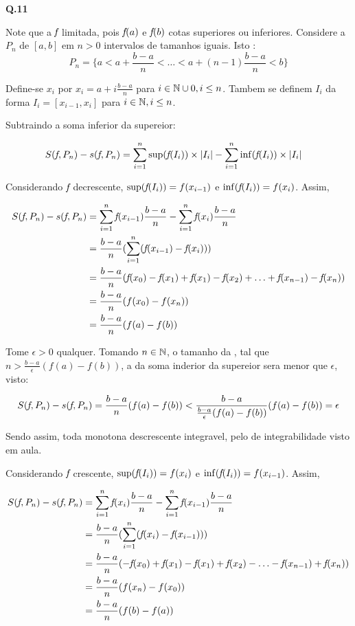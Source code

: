 \textbf{Q.11}

Note que a \funcao $\mkern-2mu f\mkern-3mu$ \eh limitada, pois $\mkern-2mu f\mkern-3mu(a)$ e $\mkern-2mu f\mkern-3mu(b)$ \sao cotas superiores ou inferiores. Considere a \particao $P_n$ de $[a,b]$ em $n > 0$ intervalos de tamanhos iguais. Isto \eh:
$$
P_n = \{a < a + \frac{b-a}{n} < \ldots < a + (n-1)\frac{b-a}{n} < b\}
$$

Define-se $x_i$ por $x_i = a + i\frac{b-a}{n}$ para $i \in \mathbb{N}\cup {0}, i \leq n$. Tambem se definem $I_i$ da forma $I_i = [x_{i-1}, x_i]$ para $i \in \mathbb{N}, i \leq n$.


Subtraindo a soma inferior da supereior:

\begin{align*}
	S(\mkern-2mu f\mkern-3mu,P_n) - s(\mkern-2mu f\mkern-3mu,P_n) &= \sum_{i=1}^{n} \sup(\mkern-2mu f\mkern-3mu(I_i))\times|I_i| - \sum_{i=1}^{n} \inf(\mkern-2mu f\mkern-3mu(I_i))\times|I_i|
\end{align*}

Considerando $\mkern-2mu f\mkern-3mu$ decrescente, $\sup(\mkern-2mu f\mkern-3mu(I_i)) = f(x_{i-1})$ e $\inf(\mkern-2mu f\mkern-3mu(I_i)) = f(x_i)$. Assim, 

\begin{align*}
	S(\f,P_n) - s(\f,P_n) &= \sum_{i=1}^{n} \f (x_{i-1})\frac{b-a}{n} - \sum_{i=1}^{n} \f (x_i)\frac{b-a}{n} \\
	&= \frac{b-a}{n}(\sum_{i=1}^{n}(\f (x_{i-1}) - \f (x_i))) \\
	&= \frac{b-a}{n}(\f (x_0) - \f (x_1) + \f (x_1) - \f (x_2) + \ldots + \f(x_{n-1}) - \f(x_n)) \\
	&= \frac{b-a}{n}(f(x_0) - f(x_n)) \\
	&= \frac{b-a}{n}(f(a)-f(b)) \\
\end{align*}

Tome $\epsilon > 0$ qualquer. Tomando $n \in \mathbb{N}$, o tamanho da \particao, tal que \mbox{$n > \frac{b-a}{\epsilon}(f(a)-f(b))$}, \entao a \subtracao da soma inderior da supereior sera menor que $\epsilon$, visto:

$$
S(\mkern-2mu f\mkern-3mu,P_n) - s(\mkern-2mu f\mkern-3mu,P_n) = \frac{b-a}{n}(f(a)-f(b)) < \frac{b-a}{\frac{b-a}{\epsilon}(f(a)-f(b))}(f(a)-f(b)) = \epsilon
$$

Sendo assim, toda \funcao monotona descrescente \eh integravel, pelo \criterio de integrabilidade visto em aula.

Considerando $\mkern-2mu f\mkern-3mu$ crescente, $\sup(\mkern-2mu f\mkern-3mu(I_i)) = f(x_i)$ e $\inf(\mkern-2mu f\mkern-3mu(I_i)) = f(x_{i-1})$. Assim, 

\begin{align*}
	S(\f,P_n) - s(\f,P_n) &= \sum_{i=1}^{n} \f (x_i)\frac{b-a}{n} - \sum_{i=1}^{n} \f (x_{i-1})\frac{b-a}{n} \\
	&= \frac{b-a}{n}(\sum_{i=1}^{n}(\f (x_i) - \f (x_{i-1}))) \\
	&= \frac{b-a}{n}(-\f (x_0) + \f (x_1) - \f (x_1) + \f (x_2) - \ldots - \f(x_{n-1}) + \f(x_n)) \\
	&= \frac{b-a}{n}(f(x_n) - f(x_0)) \\
	&= \frac{b-a}{n}(f(b)-f(a)) \\
\end{align*}


